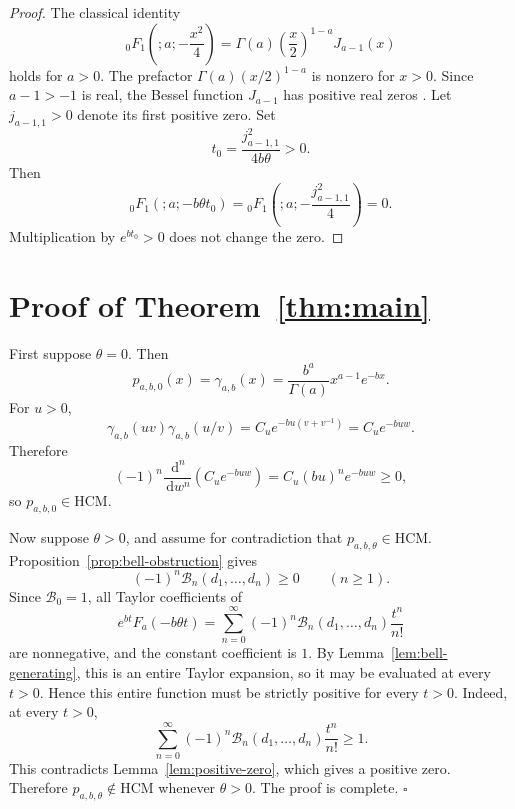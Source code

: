 ﻿\documentclass[preprint,12pt,authoryear]{elsarticle}
\newcommand{\dd}{\,\mathrm{d}}
\newcommand{\HCM}{\mathrm{HCM}}
\begin{document}
\begin{proof}
The classical identity \cite[Eq.~10.16.9]{DLMF}
\begin{equation}
{}_0F_1\!\left(;a;-\frac{x^2}{4}\right)
=
\Gamma(a)\left(\frac{x}{2}\right)^{1-a}J_{a-1}(x)
\end{equation}
holds for \(a>0\).  The prefactor \(\Gamma(a)(x/2)^{1-a}\) is nonzero for \(x>0\).  Since \(a-1>-1\) is real, the Bessel function \(J_{a-1}\) has positive real zeros \cite[Section~10.21(i)]{DLMF}.  Let \(j_{a-1,1}>0\) denote its first positive zero.  Set
\begin{equation}
t_0=\frac{j_{a-1,1}^2}{4b\theta}>0.
\end{equation}
Then
\begin{equation}
{}_0F_1(;a;-b\theta t_0)
=
{}_0F_1\!\left(;a;-\frac{j_{a-1,1}^2}{4}\right)
=
0.
\end{equation}
Multiplication by \(e^{bt_0}>0\) does not change the zero.
\end{proof}

\section{Proof of Theorem~\ref{thm:main}}
\label{sec:proof-main}

First suppose \(\theta=0\).  Then
\begin{equation}
p_{a,b,0}(x)=\gamma_{a,b}(x)
=
\frac{b^a}{\Gamma(a)}x^{a-1}e^{-bx}.
\end{equation}
For \(u>0\),
\begin{equation}
\gamma_{a,b}(uv)\gamma_{a,b}(u/v)
=
C_u e^{-bu(v+v^{-1})}
=
C_u e^{-buw}.
\end{equation}
Therefore
\begin{equation}
(-1)^n\frac{\dd^n}{\dd w^n}
\left(C_u e^{-buw}\right)
=
C_u(bu)^ne^{-buw}\ge0,
\end{equation}
so \(p_{a,b,0}\in\HCM\).

Now suppose \(\theta>0\), and assume for contradiction that \(p_{a,b,\theta}\in\HCM\).  Proposition~\ref{prop:bell-obstruction} gives
\begin{equation}
(-1)^n\mathcal B_n(d_1,\dots,d_n)\ge0
\qquad(n\ge1).
\end{equation}
Since \(\mathcal B_0=1\), all Taylor coefficients of
\begin{equation}
e^{bt}F_a(-b\theta t)
=
\sum_{n=0}^{\infty}
(-1)^n\mathcal B_n(d_1,\dots,d_n)\frac{t^n}{n!}
\end{equation}
are nonnegative, and the constant coefficient is \(1\).  By Lemma~\ref{lem:bell-generating}, this is an entire Taylor expansion, so it may be evaluated at every \(t>0\).  Hence this entire function must be strictly positive for every \(t>0\).  Indeed, at every \(t>0\),
\begin{equation}
\sum_{n=0}^{\infty}
(-1)^n\mathcal B_n(d_1,\dots,d_n)\frac{t^n}{n!}
\ge1.
\end{equation}
This contradicts Lemma~\ref{lem:positive-zero}, which gives a positive zero.  Therefore \(p_{a,b,\theta}\notin\HCM\) whenever \(\theta>0\).  The proof is complete.
\(\square\)
\end{document}
